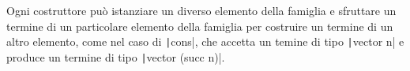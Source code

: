 Ogni costruttore può istanziare un diverso elemento della famiglia e sfruttare un termine di un particolare elemento della famiglia per costruire un termine di un altro elemento, come nel caso di \texttt|cons|, che accetta un temine di tipo \texttt|vector n| e produce un termine di tipo \texttt|vector (succ n)|.

\begin{comment}
Una prova per induzione segue il medesimo principio, semplicemente il codominio $C\,n$ è un abitante di \begin{mintinline}{Lean} Prop \end{mintinline} e l'ipotesi induttiva è rappresentata dalla chiamata ricorsiva:

Le parole chiave \begin{mintinline}{Lean} theorem \end{mintinline} e \begin{mintinline}{Lean} lemma \end{mintinline} sono versioni alternative di \begin{mintinline}{Lean} def \end{mintinline} nel caso di proposizioni.

La Tabella 2.1 può essere estesa con i nuovi legami introdotti:
\begin{center}
\begin{tabular}{ | c | c | } 
  \hline
  \textbf{Logica} & \textbf{Teoria dei tipi} \\ 
  \hline
  Induzione & Ricorsione \\ 
  \hline
  Ipotesi induttiva & Chiamata ricorsiva \\ 
  \hline
\end{tabular}
\end{center}
\end{comment}